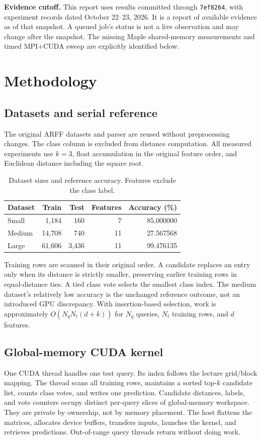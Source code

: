 \documentclass[conference]{IEEEtran}
\begin{document}
\textbf{Evidence cutoff.} This report uses results committed through \texttt{7ef8264}, with experiment records dated October 22--23, 2026. It is a report of available evidence as of that snapshot. A queued job's status is not a live observation and may change after the snapshot. The missing Maple shared-memory measurements and timed MPI+CUDA sweep are explicitly identified below.

\section{Methodology}
\subsection{Datasets and serial reference}
The original ARFF datasets and parser are reused without preprocessing changes. The class column is excluded from distance computation. All measured experiments use $k=3$, float accumulation in the original feature order, and Euclidean distance including the square root.
\begin{table}[t]\centering
\caption{Dataset sizes and reference accuracy. Features exclude the class label.}\label{tab:data}
\small\begin{tabular}{lrrrr}\toprule
Dataset & Train & Test & Features & Accuracy (\%)\\\midrule
Small & 1,184 & 160 & 7 & 85.000000\\
Medium & 14,708 & 740 & 11 & 27.567568\\
Large & 61,606 & 3,436 & 11 & 99.476135\\\bottomrule
\end{tabular}\end{table}
Training rows are scanned in their original order. A candidate replaces an entry only when its distance is strictly smaller, preserving earlier training rows in equal-distance ties. A tied class vote selects the smallest class index. The medium dataset's relatively low accuracy is the unchanged reference outcome, not an introduced GPU discrepancy. With insertion-based selection, work is approximately $O(N_qN_t(d+k))$ for $N_q$ queries, $N_t$ training rows, and $d$ features.

\subsection{Global-memory CUDA kernel}
One CUDA thread handles one test query. Its index follows the lecture grid/block mapping. The thread scans all training rows, maintains a sorted top-$k$ candidate list, counts class votes, and writes one prediction. Candidate distances, labels, and vote counters occupy distinct per-query slices of global-memory workspace. They are private by ownership, not by memory placement. The host flattens the matrices, allocates device buffers, transfers inputs, launches the kernel, and retrieves predictions. Out-of-range query threads return without doing work.
\end{document}
